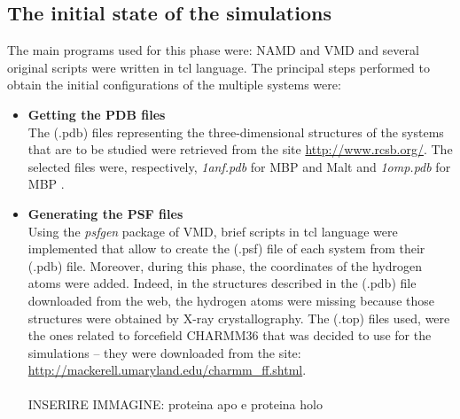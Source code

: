 \subsection{The initial state of the simulations}
The main programs used for this phase were: NAMD \cite{ref:NAMD} and VMD \cite{humphrey1996vmd} and several original scripts were written in tcl language. The principal steps performed to obtain the initial configurations of the multiple systems were:
\begin{itemize}
\item \textbf{Getting the PDB files}\\
The (.pdb) files representing the three-dimensional structures of the systems that are to be studied were retrieved from the site \url{http://www.rcsb.org/}. The selected files were, respectively, \textit{1anf.pdb} for MBP and Malt \cite{quiocho1997extensive} and \textit{1omp.pdb} for MBP \cite{sharff1992crystallographic}.

\item \textbf{Generating the PSF files}\\
Using the \textit{psfgen} package of VMD, brief scripts in tcl language were implemented that allow to create the (.psf) file of each system from their (.pdb) file. Moreover, during this phase, the coordinates of the hydrogen atoms were added. Indeed, in the structures described in the (.pdb) file downloaded from the web, the hydrogen atoms were missing because those structures were obtained by X-ray crystallography. The (.top) files used, were the ones related to forcefield CHARMM36 that was decided to use for the simulations -- they were downloaded from the site: \url{http://mackerell.umaryland.edu/charmm_ff.shtml}. \\
\\
INSERIRE IMMAGINE: proteina apo e proteina holo\\


\end{itemize}

